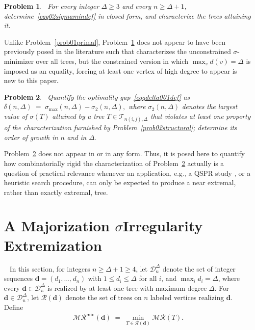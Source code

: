 \documentclass[12pt]{amsart}
\newtheorem{problem}{Problem}
\newcommand{\TT}{\mathcal{T}}
\newcommand{\RR}{\mathcal{MR}}
\begin{document}
\begin{problem}~\label{prob03dual}
For every integer $\Delta\geqslant 3$ and every $n\geqslant \Delta+1$, determine~\eqref{eqq02sigmamindef} in closed form, and characterize the trees attaining it.
\end{problem}

Unlike Problem~\ref{prob01primal}, Problem~\ref{prob03dual} does not appear to
have been previously posed in the literature such that \cite{AbdoEtAl2018} characterizes the unconstrained $\sigma$-minimizer over  all trees, but the constrained version in
which $\max_v d(v)=\Delta$ is imposed as an equality, forcing at least one vertex of high degree to appear is new to this paper.

\begin{problem}~\label{prob04stability}
Quantify the  optimality gap~\eqref{eqqdelta001def} as $\delta(n,\Delta) \;=\; \sigma_{\max}(n,\Delta) - \sigma_2(n,\Delta),$ where $\sigma_2(n,\Delta)$ denotes the largest value of $\sigma(T)$ attained
by a tree $T\in \TT_{n(i,j), \Delta}$ that violates at
least one property of the characterization furnished by
Problem~\ref{prob02structural}; determine its order of growth in $n$ and in $\Delta$.
\end{problem}

Problem~\ref{prob04stability} does not appear in \cite{DimitrovPaper2025} or \cite{VukicevicEtAl2024} in any form. Thus, it is posed here to quantify how combinatorially rigid the characterization of Problem~\ref{prob04stability}
actually is  a question of practical relevance whenever an application, e.g., a QSPR study \cite{RetiEtAl2018}, or a heuristic search procedure, can only be expected to produce a near extremal, rather than exactly extremal, tree.

 
\section{A Majorization \texorpdfstring{$\sigma$}-Irregularity Extremization}~\label{sec03framework}
In this section, for integers $n\ge \Delta+1\ge 4$, let $\mathcal D_n^\Delta$ denote the set of integer sequences $\mathbf d=(d_1,\dots,d_n)$ with $1\le d_i\le\Delta$ for all $i$, and $\max_i d_i=\Delta$, where every $\mathbf d\in\mathcal D_n^\Delta$ is realized by at least one tree with maximum degree $\Delta$.
For $\mathbf d\in\mathcal D_n^\Delta$, let $\mathcal R(\mathbf d)$ denote the
set of trees on $n$ labeled vertices realizing $\mathbf d$. Define
\begin{equation}~\label{eqm2min01def}
\RR^{\min}(\mathbf d) \;=\; \min_{T\in\mathcal R(\mathbf d)} \RR(T).
\end{equation}
\end{document}
